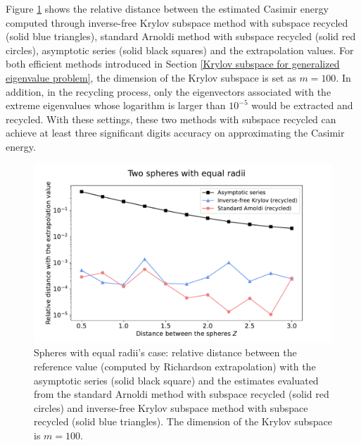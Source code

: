 Figure \ref{equal_radii_rel_dist} shows the relative distance between the estimated Casimir energy computed through inverse-free Krylov subspace method with subspace 
recycled (solid blue triangles), standard Arnoldi method with subspace recycled (solid red circles), asymptotic series (solid black squares) and the extrapolation values.
For both efficient methods introduced in Section \ref{Krylov subspace for generalized eigenvalue problem}, the dimension of the Krylov subspace is set as $m = 100$. 
In addition, in the recycling process, only the eigenvectors associated with the extreme eigenvalues whose logarithm is larger than $10^{-5}$
would be extracted and recycled. With these settings, these two methods with subspace recycled can achieve at least three significant digits accuracy on 
approximating the Casimir energy.

\begin{figure}[H]
    \centering
    \includegraphics[scale = 0.5]{figures/relative_distance_equal_radii.pdf}
    \caption{Spheres with equal radii's case: relative distance between the reference value (computed by Richardson extrapolation) with the asymptotic series (solid black square)  
    and the estimates evaluated from the standard Arnoldi method with subspace recycled (solid red circles) and inverse-free Krylov subspace method 
    with subspace recycled (solid blue triangles). The dimension of the Krylov subspace is $m = 100$.}
    \label{equal_radii_rel_dist}
\end{figure}
 
